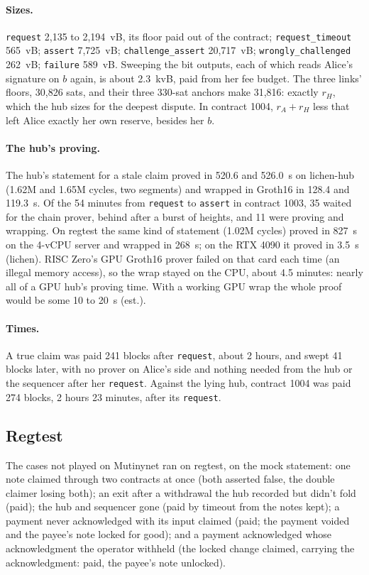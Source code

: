 \documentclass[11pt]{article}
\newcommand{\tx}[1]{\texttt{#1}}
\begin{document}
\paragraph{Sizes.} \tx{request} 2,135 to 2,194~vB, its floor paid out of
the contract; \tx{request\_timeout} 565~vB; \tx{assert} 7,725~vB;
\tx{challenge\_assert} 20,717~vB; \tx{wrongly\_challenged} 262~vB;
\tx{failure} 589~vB. Sweeping the bit outputs, each of which reads
Alice's signature on $b$ again, is about 2.3~kvB, paid from her fee
budget. The three links' floors, 30,826 sats, and their three 330-sat
anchors make 31,816: exactly $r_H$, which the hub sizes for the deepest
dispute. In contract 1004, $r_A + r_H$ less that left Alice exactly her
own reserve, besides her $b$.

\paragraph{The hub's proving.} The hub's statement for a stale claim
proved in 520.6 and 526.0~s on lichen-hub (1.62M and 1.65M cycles, two
segments) and wrapped in Groth16 in 128.4 and 119.3~s. Of the 54
minutes from \tx{request} to \tx{assert} in contract 1003, 35 waited
for the chain prover, behind after a burst of heights, and 11 were
proving and wrapping. On regtest the same kind of statement (1.02M
cycles) proved in 827~s on the 4-vCPU server and wrapped in 268~s; on
the RTX 4090 it proved in 3.5~s (lichen). RISC Zero's GPU Groth16
prover failed on that card each time (an illegal memory access), so the
wrap stayed on the CPU, about 4.5 minutes: nearly all of a GPU hub's
proving time. With a working GPU wrap the whole proof would be some 10
to 20~s (est.).

\paragraph{Times.} A true claim was paid 241 blocks after
\tx{request}, about 2 hours, and swept 41 blocks later, with no prover on
Alice's side and nothing needed from the hub or the sequencer after her
\tx{request}. Against the lying hub, contract 1004 was paid 274 blocks, 2 hours 23
minutes, after its \tx{request}.

\subsection{Regtest}

The cases not played on Mutinynet ran on regtest, on the mock
statement: one note claimed through two contracts at once (both
asserted false, the double claimer losing both); an exit after a
withdrawal the hub recorded but didn't fold (paid); the hub and
sequencer gone (paid by timeout from the notes kept); a payment never
acknowledged with its input claimed (paid; the payment voided and the
payee's note locked for good); and a payment acknowledged whose
acknowledgment the operator withheld (the locked change claimed,
carrying the acknowledgment: paid, the payee's note unlocked).
\end{document}
